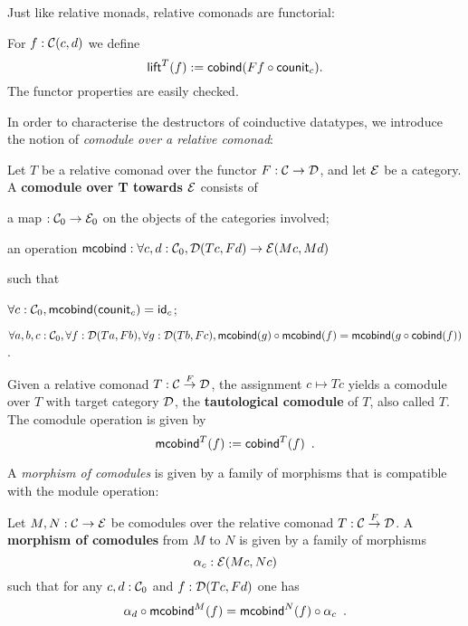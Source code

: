 \documentclass{amsart}
\newcommand{\fat}[1]{\textbf{#1}}
\begin{document}
Just like relative monads, relative comonads are functorial:
\begin{definition}
 For $f : \C(c,d)$ we define
  \[ \lift^T(f) := \cobind(\comp{\counit_c}{Ff}) .  \]
 The functor properties are easily checked.
\end{definition}


In order to characterise the destructors of coinductive datatypes, we introduce the notion of \emph{comodule
over a relative comonad}:

\begin{definition}\label{def:comodule}
 Let $T$ be a relative comonad over the functor $F:\C\to\D$, and let $\E$ be a category.
 A \fat{comodule over T towards $\E$} consists of
   \begin{packitem}
   \item a map $:\C_0 \to \E_0$ on the objects of the categories involved;
   \item an operation $\mcobind: \forall c,d:\C_0, \D(Tc,Fd) \to \E(Mc,Md)$
  \end{packitem}
  such that 
  \begin{packitem}
   \item $\forall c : \C_0, \mcobind(\counit_c) = \id_c$;
   \item $\forall a,b,c:\C_0, \forall f : \D(Ta,Fb),\forall g:\D(Tb,Fc), \\
        \comp{\mcobind(f)}{\mcobind(g)} = \mcobind(\comp{\cobind(f)}{g})$ .
  \end{packitem}

\end{definition}

\begin{example}\label{def:tautological_comodule}
  Given a relative comonad $T : \C\stackrel{F}{\to}\D$, the assignment $c \mapsto Tc$ yields a comodule over $T$ 
  with target category $\D$, the \textbf{tautological comodule} of $T$, also called $T$.
  The comodule operation is given by
    \[  \mcobind^T(f) := \cobind^T(f) \enspace . \]
\end{example}


A \emph{morphism of comodules} is given by a family of morphisms that is compatible with 
the module operation:

\begin{definition}\label{def:morphism_of_comodules}
 Let $M, N : \C \to \E$ be comodules over the relative comonad $T : \C \stackrel{F}{\to} \D$.
 A \fat{morphism of comodules} from $M$ to $N$ is given by a family of morphisms 
   \[ \alpha_c:\E(Mc,Nc) \]
 such that for any $c,d:\C_0$ and $f : \D(Tc,Fd)$ one has
 \[   \comp{\mcobind^M(f)}{\alpha_d} = \comp{\alpha_c}{\mcobind^N(f)} \enspace . \]
\end{definition}
\end{document}
